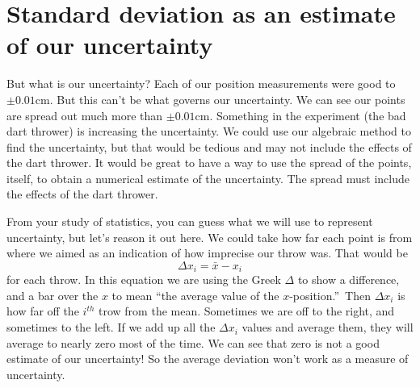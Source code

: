 \documentclass[twoside,11pt,ShortChapTitles]{BYUTextbook}
\begin{document}
\section{Standard deviation as an estimate of our uncertainty}

But what is our uncertainty? Each of our position measurements were good to $%
\pm 0.01\text{cm}.$ But this can't be what governs our uncertainty. We can
see our points are spread out much more than $\pm 0.01\text{cm}.$ Something
in the experiment (the bad dart thrower) is increasing the uncertainty. We
could use our algebraic method to find the uncertainty, but that would be
tedious and may not include the effects of the dart thrower. It would be
great to have a way to use the spread of the points, itself, to obtain a
numerical estimate of the uncertainty. The spread must include the effects
of the dart thrower.

From your study of statistics, you can guess what we will use to represent
uncertainty, but let's reason it out here. We could take how far each point
is from where we aimed as an indication of how imprecise our throw was. That
would be
\[
\Delta x_{i}=\bar{x}-x_{i}
\]%
for each throw. In this equation we are using the Greek $\Delta $ to show a
difference, and a bar over the $x$ to mean \textquotedblleft the average
value of the $x$-position.\textquotedblright\ Then $\Delta x_{i}$ is how far
off the $i^{th}$ trow from the mean. Sometimes we are off to the right, and
sometimes to the left. If we add up all the $\Delta x_{i}$ values and
average them, they will average to nearly zero most of the time. We can see
that zero is not a good estimate of our uncertainty! So the average
deviation won't work as a measure of uncertainty.
\end{document}
